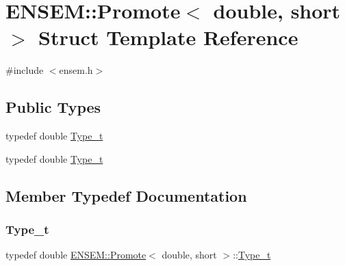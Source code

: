 \hypertarget{structENSEM_1_1Promote_3_01double_00_01short_01_4}{}\section{E\+N\+S\+EM\+:\+:Promote$<$ double, short $>$ Struct Template Reference}
\label{structENSEM_1_1Promote_3_01double_00_01short_01_4}


{\ttfamily \#include $<$ensem.\+h$>$}

\subsection*{Public Types}
\begin{DoxyCompactItemize}
\item 
typedef double \mbox{\hyperlink{structENSEM_1_1Promote_3_01double_00_01short_01_4_add06e396481b481fe69ed962df8e530a}{Type\+\_\+t}}
\item 
typedef double \mbox{\hyperlink{structENSEM_1_1Promote_3_01double_00_01short_01_4_add06e396481b481fe69ed962df8e530a}{Type\+\_\+t}}
\end{DoxyCompactItemize}


\subsection{Member Typedef Documentation}
\mbox{\label{structENSEM_1_1Promote_3_01double_00_01short_01_4_add06e396481b481fe69ed962df8e530a}} 
\subsubsection{\texorpdfstring{Type\_t}{Type\_t}\hspace{0.1cm}{\footnotesize\ttfamily [1/2]}}
{\footnotesize\ttfamily typedef double \mbox{\hyperlink{structENSEM_1_1Promote}{E\+N\+S\+E\+M\+::\+Promote}}$<$ double, short $>$\+::\mbox{\hyperlink{structENSEM_1_1Promote_3_01double_00_01short_01_4_add06e396481b481fe69ed962df8e530a}{Type\+\_\+t}}}

\mbox{\label{structENSEM_1_1Promote_3_01double_00_01short_01_4_add06e396481b481fe69ed962df8e530a}} 
